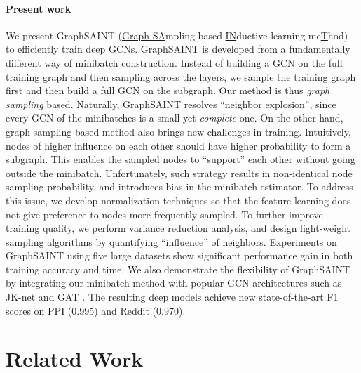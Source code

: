 \documentclass{article} \usepackage{iclr2020_conference,times}
\newcommand{\graphsaint}{{\fontfamily{lmtt}\selectfont GraphSAINT}}
\begin{document}
\paragraph{Present work} We present {\graphsaint} (\underline{Graph SA}mpling based \underline{IN}ductive learning me\underline{T}hod) to efficiently train deep GCNs. {\graphsaint} is developed from a fundamentally different way of minibatch construction. Instead of building a GCN on the full training graph and then sampling across the layers, we sample the training graph first and then build a full GCN on the subgraph. Our method is thus \textit{graph sampling} based. 
Naturally, {\graphsaint} resolves ``neighbor explosion'', since every GCN of the minibatches is a small yet \textit{complete} one. 
On the other hand, graph sampling based method also brings new challenges in training. 
Intuitively, nodes of higher influence on each other should have higher probability to form a subgraph. This enables the sampled nodes to ``support'' each other without going outside the minibatch. 
Unfortunately, such strategy results in non-identical node sampling probability, and introduces bias in the minibatch estimator. 
To address this issue, we develop normalization techniques so that the feature learning does not give preference to nodes more frequently sampled. To further improve training quality, we perform variance reduction analysis, and design light-weight sampling algorithms by quantifying ``influence'' of neighbors. 
Experiments on {\graphsaint} using five large datasets show significant performance gain in both training accuracy and time. 
We also demonstrate the flexibility of {\graphsaint} by integrating our minibatch method with popular GCN architectures such as JK-net \citep{jk-net} and GAT \citep{gat}. 
The resulting deep models achieve new state-of-the-art F1 scores on PPI (0.995) and Reddit (0.970). 
 \section{Related Work}
\end{document}
